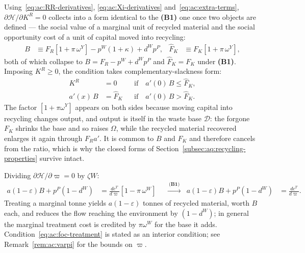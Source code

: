  Using~\eqref{eq:ac:RR-derivatives}, \eqref{eq:ac:Xi-derivatives} and~\eqref{eq:ac:extra-terms}, $\partial\mathcal H/\partial K^R=0$ collects into a form identical to the \textbf{(B1)} one once two objects are defined --- the social value of a marginal unit of recycled material and the social opportunity cost of a unit of capital moved into recycling:
\begin{align}
B &\equiv F_R\left[1+\pi\,\omega^Y\right]-p^W\left(1+\kappa\right)+d^Wp^P,
&
\widehat F_K &\equiv F_K\left[1+\pi\,\omega^Y\right],
\label{eq:ac:B}
\end{align}
both of which collapse to $B=F_R-p^W+d^Wp^P$ and $\widehat F_K=F_K$ under \textbf{(B1)}. Imposing $K^R\ge0$, the condition takes complementary-slackness form:
\begin{subequations}\label{eq:ac:foc-recycling}
\begin{align}
K^R&=0
&&\text{if}\quad a'(0)\,B\le \widehat F_K,
\label{eq:ac:foc-recycling-a}
\\
a'(x)\,B&=\widehat F_K
&&\text{if}\quad a'(0)\,B> \widehat F_K.
\label{eq:ac:foc-recycling-b}
\end{align}
\end{subequations}
The factor $\left[1+\pi\omega^Y\right]$ appears on both sides because moving capital into recycling changes output, and output is itself in the waste base $\mathcal D$: the forgone $F_K$ shrinks the base and so raises $\Omega$, while the recycled material recovered enlarges it again through $F_Ra'$. It is common to $B$ and $\widehat F_K$ and therefore cancels from the ratio, which is why the closed forms of Section~\ref{subsec:aq:recycling-properties} survive intact.

 Dividing $\partial\mathcal H/\partial\varpi=0$ by $\zeta W$:
\begin{align}
a\left(1-\varepsilon\right)B+p^P\left(1-d^W\right) &= \frac{dc^T}{d\varpi}\left[1-\pi\,\omega^W\right]
&&\xrightarrow{\ \textbf{(B1)}\ }
&
a\left(1-\varepsilon\right)B+p^P\left(1-d^W\right) &= \frac{dc^T}{d\varpi}.
\label{eq:ac:foc-treatment}
\end{align}
Treating a marginal tonne yields $a(1-\varepsilon)$ tonnes of recycled material, worth $B$ each, and reduces the flow reaching the environment by $\left(1-d^W\right)$; in general the marginal treatment cost is credited by $\pi\omega^W$ for the base it adds. Condition~\eqref{eq:ac:foc-treatment} is stated as an interior condition; see Remark~\ref{rem:ac:varpi} for the bounds on $\varpi$.

